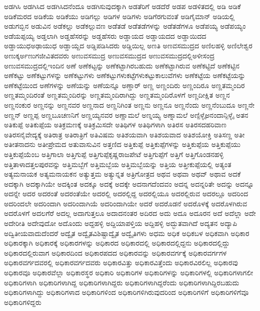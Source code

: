 {ಅಡಗಿಸಿ
ಅಡಗಿಸಿದ
ಅಡಗಿಸಿದನೆಂದೂ
ಅಡಗಿಸುವುದಕ್ಕಾಗಿ
ಅಡತೆರಿಗೆ
ಅಡದೆರೆ
ಅಡಪ
ಅಡಳಿತದಲ್ಲಿ
ಅಡಿ
ಅಡಿಕೆ
ಅಡಿಕೆಮರದ
ಅಡಿಕೆಯ
ಅಡಿಕೆಯು
ಅಡಿಗಲ್ಲು
ಅಡಿಗಳ
ಅಡಿಗಳು
ಅಡಿಗೆರಗುವಂತೆ
ಅಡಿಗೈಮಾನ್
ಅಡಿಯಲ್ಲಿ
ಅಡುಗಬ್ಬಿನ
ಅಡುವಿನ
ಅಡೆಕಲ್ಲು
ಅಡೆಕಲ್ಲುವಣ
ಅಡೆತಡೆ
ಅಡೆತಡೆಗಳನ್ನು
ಅಡೆತಡೆಗಳೂ
ಅಡೆಪಯ್ಯ
ಅಡೆಪಯ್ಯಂ
ಅಡೆಯಪ್ಪಯ್ಯ
ಅಡ್ಡಲಾಗಿ
ಅಡ್ಡಹೆಸರನ್ನು
ಅಡ್ಡಹೆಸರು
ಅಡ್ಡಾಯದ
ಅಡ್ಡಾಯದದ
ಅಡ್ಡಾಯಿದದ
ಅಡ್ಡಾಯುಧಅಢಾಯುಧ
ಅಡ್ಡಾಯ್ದದ
ಅಡ್ಡಿಪಡಿಸಿದರು
ಅಡ್ಡಿಯಿಲ್ಲ
ಅಣತಿ
ಅಣವಸಮುದ್ರದ
ಅಣಿಲಹಳ್ಳಿ
ಅಣಿಲೇಶ್ವರ
ಅಣುಕ್ಕರ್ಅಣುಗಜೀವಿತದವರು
ಅಣುವಸಮುದ್ರ
ಅಣುವಸಮುದ್ರದ
ಅಣುವಸಮುದ್ರದಲ್ಲಿಅಳೀಸಂದ್ರ
ಅಣುವಸಮುದ್ರದಲ್ಲಿಇಂದಿನ
ಅಣೆ
ಅಣೆಕಟ್ಟನ್ನು
ಅಣೆಕಟ್ಟಾಗಿರಬಹುದು
ಅಣೆಕಟ್ಟಾಗಿರುವ
ಅಣೆಕಟ್ಟಿದೆ
ಅಣೆಕಟ್ಟಿನ
ಅಣೆಕಟ್ಟು
ಅಣೆಕಟ್ಟುಗಳನ್ನು
ಅಣೆಕಟ್ಟುಗಳು
ಅಣೆಕಟ್ಟುಗಳುಕಟ್ಟೆಗಳುಕಟ್ಟುಕಾಲುವೆಗಳು
ಅಣೆಕಟ್ಟೆಯ
ಅಣೆಕಟ್ಟೆಯನ್ನು
ಅಣೆಕಟ್ಟೆಯಿಂದ
ಅಣೆಗಳನ್ನು
ಅಣೆಯನ್ನು
ಅಣೆಯನ್ನೂ
ಅಣ್ಡಾರ್
ಅಣ್ಣ
ಅಣ್ಣಂದಿರು
ಅಣ್ಣಂದಿರೂ
ಅಣ್ಣತಮ್ಮಂದಿರ
ಅಣ್ಣತಮ್ಮಂದಿರಂತೆ
ಅಣ್ಣತಮ್ಮಂದಿರನ್ನು
ಅಣ್ಣತಮ್ಮಂದಿರಾಗಿದ್ದು
ಅಣ್ಣತಮ್ಮಂದಿರೊಳಗೆ
ಅಣ್ಣದೀಕ್ಷಿತ
ಅಣ್ಣನ
ಅಣ್ಣನಂಕುರ
ಅಣ್ಣನನ್ನು
ಅಣ್ಣನವರ
ಅಣ್ಣನಾದ
ಅಣ್ಣನಿಗಿಂತ
ಅಣ್ಣನು
ಅಣ್ಣನೂ
ಅಣ್ಣನೆಂದು
ಅಣ್ಣನೆಂಬುದೂ
ಅಣ್ಣನೇ
ಅಣ್ಣನ್
ಅಣ್ಣಪ್ಪ
ಅಣ್ಣಬೂಚಣನಿಗೆ
ಅಣ್ಣಯ್ಯನವರ
ಅಣ್ಣಾಮಲೆ
ಅಣ್ನಯ್ಯ
ಅಣ್ನಾಮಲೆ
ಅಣ್ಪಿಳ್ಳೈಅನಂದಾನ್ಪಿಳ್ಳೈ
ಅತನ
ಅತಿಕುಪ್ಪೆ
ಅತಿಕುಪ್ಪೆಯ
ಅತಿಕ್ರಮಣಕ್ಕೆ
ಅತಿಕ್ರಮಿಸದೇ
ಅತಿಥಿಗಳ
ಅತಿಥಿಗಳಾಗಿ
ಅತಿರಸ
ಅತಿರಸದಹರಿವಾಣ
ಅತಿರಸನೈವೇದ್ಯಕ್ಕೆ
ಅತಿರಾತ್ರ
ಅತಿರಾತ್ರಿಗೆ
ಅತಿವಿಷಮ
ಅತಿಶಯವಾಗಿ
ಅತಿಶಯವಾದ
ಅತಿಶಯೋಕ್ತಿ
ಅತಿಸಣ್ಣ
ಅತೀ
ಅತೀತನಾದನು
ಅತೀಪ್ರೇಮದ
ಅತುವಾಸುವಿನ
ಅತ್ತಣಿದ
ಅತ್ತಿಕುಪ್ಪೆ
ಅತ್ತಿಕುಪ್ಪೆಗಳನ್ನು
ಅತ್ತಿಕುಪ್ಪೆಯ
ಅತ್ತಿಕುಪ್ಪೆಯು
ಅತ್ತಿಕುಪ್ಪೆಯೆಂಬ
ಅತ್ತಿಗಾಲಾ
ಅತ್ತಿಗುಪ್ಪೆ
ಅತ್ತಿಗುಪ್ಪೆಕೃಷ್ಣರಾಜಪೇಟೆ
ಅತ್ತಿಗುಪ್ಪೆಗೆ
ಅತ್ತಿಗೆ
ಅತ್ತಿಗೊಂಡನಹಳ್ಳಿ
ಅತ್ತಿತಾಳಾದತ್ತಲಪುರವನ್ನು
ಅತ್ತಿಮಬ್ಬೆಗೆ
ಅತ್ತಿಮಬ್ಬೆಯ
ಅತ್ತಿಮಬ್ಬೆಯನ್ನು
ಅತ್ತಿಯ
ಅತ್ತೀಕುಪ್ಪೆಯಲ್ಲಿ
ಅತ್ಯಂತ
ಅತ್ಯಮನಾಯಕ
ಅತ್ಯಮನಾಯಕನ
ಅತ್ಯುತ್ತಮ
ಅತ್ಯುನ್ನತ
ಅತ್ರಿಗೋತ್ರದ
ಅಥವ
ಅಥವಾ
ಅಥವ್
ಅಥಾವ
ಅದಕೆ
ಅದಕ್ಕಾಗಿ
ಅದಕ್ಕಾಗಿಯೇ
ಅದಕ್ಕಿಂತ
ಅದಕ್ಕೂ
ಅದಕ್ಕೆ
ಅದಕ್ಕೇ
ಅದನಾಗದೆಂದವಂ
ಅದನ್ನ
ಅದನ್ನರಿತೇ
ಅದನ್ನು
ಅದನ್ನೂ
ಅದನ್ನೇ
ಅದರ
ಅದರಂತೆ
ಅದರಂತೆಯೇ
ಅದರಲ್ಲಿ
ಅದರಲ್ಲಿದ್ದ
ಅದರಲ್ಲಿಯೂ
ಅದರಲ್ಲಿರುವ
ಅದರಲ್ಲೂ
ಅದರಿಂದ
ಅದರಿಂದಲೇ
ಅದರಿಂದಾಗಿ
ಅದರಿಂದಾಗಿಯೆ
ಅದರಿಂದಾಗಿಯೇ
ಅದರೆ
ಅದರೊಡನೆ
ಅದರೊಳಕ್ಕೆ
ಅದರೊಳಗಿರುವ
ಅದರೊಳಗೆ
ಅದಲಗೆರೆ
ಅದಲ್ಲ
ಅದಾಗುತ್ತಲೂ
ಅದಾದನಂತರ
ಅದಿರದ
ಅದು
ಅದೂ
ಅದೂರನ
ಅದೆ
ಅದೆಲ್ಲಾ
ಅದೇ
ಅದೇರೀತಿ
ಅದೇವುದೋ
ಅದೊಂದು
ಅದ್ದಹಳ್ಳಿ
ಅದ್ದಿಯಾಪಳ್ತಿಯ
ಅದ್ದಿಹಳ್ಳಿ
ಅದ್ಭುತವಾಗಿದೆ
ಅದ್ಯತನ
ಅದ್ಯಾಪಿ
ಅದ್ವಿತೀಯವಾದುದೆಂದರೆ
ಅದ್ವೈತ
ಅದ್ವೈತವಿಶಿಷ್ಟಾದ್ವೈತ
ಅದ್ವೈತಿಗಳು
ಅಧಮ
ಅಧಿಕ
ಅಧಿಕಬಳ
ಅಧಿಕವಾಗಿ
ಅಧಿಕಾರ
ಅಧಿಕಾರಕ್ಕಾಗಿ
ಅಧಿಕಾರಕ್ಕೆ
ಅಧಿಕಾರಗಳನ್ನು
ಅಧಿಕಾರದ
ಅಧಿಕಾರದಲ್ಲಿ
ಅಧಿಕಾರದಲ್ಲಿದ್ದನು
ಅಧಿಕಾರದಲ್ಲಿದ್ದು
ಅಧಿಕಾರದಲ್ಲಿರುವಾಗ
ಅಧಿಕಾರದಿಂದ
ಅಧಿಕಾರಪದದ
ಅಧಿಕಾರವನ್ನು
ಅಧಿಕಾರವರ್ಗಕ್ಕೆ
ಅಧಿಕಾರವರ್ಗಗಳ
ಅಧಿಕಾರವರ್ಗದವರಲ್ಲಿ
ಅಧಿಕಾರವರ್ಗದವರು
ಅಧಿಕಾರವಿತ್ತು
ಅಧಿಕಾರವಿತ್ತೆಂದು
ಅಧಿಕಾರವಿರಲಿಲ್ಲ
ಅಧಿಕಾರವು
ಅಧಿಕಾರವೂ
ಅಧಿಕಾರವೆಲ್ಲಾ
ಅಧಿಕಾರಸ್ಥರ
ಅಧಿಕಾರಿ
ಅಧಿಕಾರಿಗಳ
ಅಧಿಕಾರಿಗಳನ್ನು
ಅಧಿಕಾರಿಗಳಲ್ಲಿ
ಅಧಿಕಾರಿಗಳಾಗಲೀ
ಅಧಿಕಾರಿಗಳಾಗಿ
ಅಧಿಕಾರಿಗಳಾಗಿದ್ದ
ಅಧಿಕಾರಿಗಳಾಗಿದ್ದರು
ಅಧಿಕಾರಿಗಳಾಗಿದ್ದರೆಂದು
ಅಧಿಕಾರಿಗಳಾಗಿದ್ದಿರಬಹುದು
ಅಧಿಕಾರಿಗಳಾಗಿದ್ದು
ಅಧಿಕಾರಿಗಳಾದ
ಅಧಿಕಾರಿಗಳಿಂದ
ಅಧಿಕಾರಿಗಳಿಗಿರುವುದರಿಂದ
ಅಧಿಕಾರಿಗಳಿಗೆ
ಅಧಿಕಾರಿಗಳಿಗೆವೂ
ಅಧಿಕಾರಿಗಳಿದ್ದರು
}
